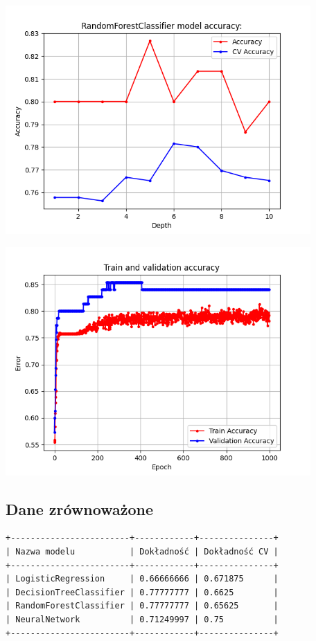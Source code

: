 \documentclass[11pt, a4paper, notitlepage]{report}
\begin{document}
\begin{center}
\includegraphics[width=330pt]{graphics/RandomForestClassifier_1}

\includegraphics[width=330pt]{graphics/NeuralNetwork_1}

\end{center}

\newpage

\subsection{Dane zrównoważone}

\begin{verbatim}
+------------------------+------------+---------------+
| Nazwa modelu           | Dokładność | Dokładność CV |
+------------------------+------------+---------------+
| LogisticRegression     | 0.66666666 | 0.671875      |
| DecisionTreeClassifier | 0.77777777 | 0.6625        |
| RandomForestClassifier | 0.77777777 | 0.65625       |
| NeuralNetwork          | 0.71249997 | 0.75          |
+------------------------+------------+---------------+
\end{verbatim}
\end{document}
